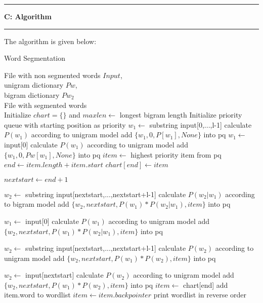 \documentclass[11pt]{article}
\newcommand\question[2]{\vspace{.25in}\hrule\textbf{#1: #2}\vspace{.5em}\hrule\vspace{.10in}}
\begin{document}
\question{C}{Algorithm} 

The algorithm is given below:		

\begin{algorithm}[htb]
	\renewcommand{\algorithmicrequire}{\textbf{Input:}\hspace{10.7pt}}
	\renewcommand\algorithmicensure {\textbf{Output:} }
	\caption{Word Segmentation}
	\label{alg:pbg}
	\begin{algorithmic}[1]
		\REQUIRE File with non segmented words $Input$,\\
		unigram dictionary $Pw$,\\ bigram dictionary $Pw_2$\\ 
		\ENSURE File with segmented words \\
		\vspace{3pt}
		\STATE Initialize $chart=\{\}$ and $maxlen \gets $ longest bigram length
		\STATE Initialize priority queue with starting position as priority
		\STATE $w_1 \gets$ substring input[0,...,l-1]
		\STATE calculate $P(w_1)$ according to unigram model 
		\STATE add $\{w_1,0,P[w_1],None\}$ into pq
		\ENDIF
		\ENDFOR
		\STATE $w_1 \gets$ input[0]
		\STATE calculate $P(w_1)$ according to unigram model  
		\STATE add $\{w_1,0,Pw[w_1],None\}$ into pq
		\ENDIF
		\STATE $item \gets$ highest priority item from pq
		\STATE $end \gets item.length+item.start$ 
		\STATE $chart[end] \gets item$
		\ENDIF
		
		\STATE $nextstart \gets end+1$
		
		\STATE $w_2 \gets$ substring input[nextstart,...,nextstart+l-1] 
		\STATE calculate $P(w_2|w_1)$ according to bigram model 
		\STATE add $\{w_2,nextstart, P(w_1)*P(w_2|w_1),item\}$ into pq
		\ENDFOR
		
		\STATE $w_1 \gets$ input[0]
		\STATE calculate $P(w_1)$ according to unigram model  
		\STATE add $\{w_2,nextstart,P(w_1)*P(w_2|w_1),item\}$ into pq
		\ENDIF
		
		\ELSE
		\STATE $w_2 \gets$ substring input[nextstart,...,nextstart+l-1] 
		\STATE calculate $P(w_2)$ according to unigram model 
		\STATE add $\{w_2,nextstart,P(w_1)*P(w_2),item\}$ into pq
		\ENDFOR
		
		\STATE $w_2 \gets$ input[nextstart]
		\STATE calculate $P(w_2)$ according to unigram model  
		\STATE add $\{w_2,nextstart,P(w_1)*P(w_2),item\}$ into pq
		\ENDIF
		\ENDIF
		\ENDWHILE
		\STATE $item \gets$ chart[end]
		\STATE add item.word to wordlist
		\STATE $item \gets item.backpointer$
		\ENDWHILE
		\STATE print wordlist in reverse order
	\end{algorithmic}
\end{algorithm}
\end{document}
